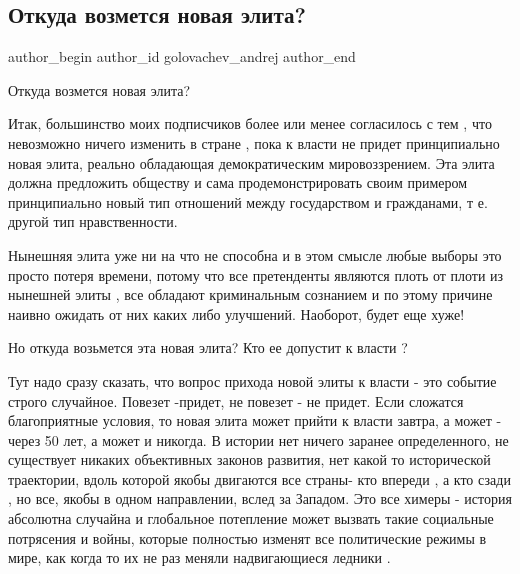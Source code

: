  
 
 
 
 
 
\subsection{Откуда   возмется новая элита?}
\label{sec:28_08_2021.fb.golovachev_andrej.1.ukraina_elita}
 
\ifcmt
 author_begin
   author_id golovachev_andrej
 author_end
\fi

Откуда   возмется новая элита?

Итак, большинство  моих подписчиков  более или менее согласилось  с тем ,  что
невозможно ничего  изменить в стране , пока к власти не придет принципиально
новая элита,  реально  обладающая  демократическим  мировоззрением.    Эта
элита должна предложить обществу и сама продемонстрировать своим примером
принципиально   новый тип отношений между  государством и гражданами, т е.
другой тип нравственности.

Нынешняя элита уже ни на что не способна и в этом смысле любые выборы это
просто потеря времени, потому  что все претенденты   являются плоть от плоти из
нынешней элиты , все  обладают криминальным сознанием и  по этому причине
наивно ожидать от них каких либо улучшений. Наоборот,  будет еще хуже!

Но откуда возьмется   эта новая элита?  Кто ее допустит к власти ? 

Тут надо сразу сказать, что вопрос прихода новой элиты к власти  - это событие
строго случайное. Повезет -придет, не повезет - не придет.   Если сложатся
благоприятные условия, то новая элита может прийти к власти завтра, а может -
через 50 лет, а может  и никогда.   В истории нет ничего заранее
определенного, не существует никаких  объективных законов развития, нет  какой
то исторической траектории, вдоль которой якобы двигаются все страны- кто
впереди , а кто сзади , но все, якобы  в одном направлении, вслед за Западом.
Это все химеры - история абсолютна случайна  и глобальное потепление может
вызвать такие социальные потрясения и войны, которые полностью изменят все
политические режимы в мире, как когда то их не раз меняли надвигающиеся ледники
.

